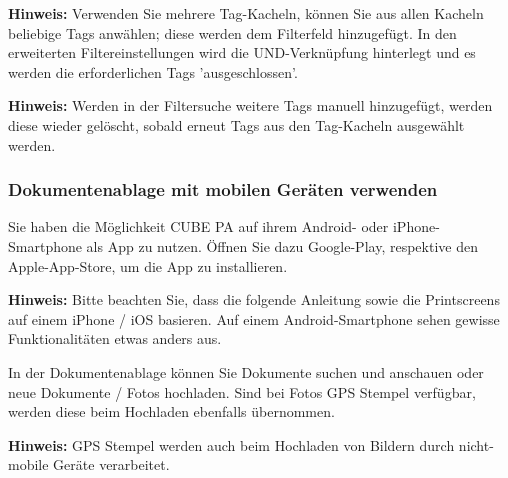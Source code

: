 \textbf{Hinweis:} Verwenden Sie mehrere Tag-Kacheln, können Sie aus allen Kacheln beliebige Tags anwählen; diese werden dem Filterfeld hinzugefügt. In den erweiterten Filtereinstellungen  wird die UND-Verknüpfung  hinterlegt und es werden die erforderlichen Tags 'ausgeschlossen'.

\vspace{\baselineskip}

\textbf{Hinweis:} Werden in der Filtersuche weitere Tags manuell hinzugefügt, werden diese wieder gelöscht, sobald erneut Tags aus den Tag-Kacheln ausgewählt werden.

\subsubsection{Dokumentenablage mit mobilen Geräten verwenden}

Sie haben die Möglichkeit CUBE PA auf ihrem Android- oder iPhone-Smartphone als App zu nutzen. Öffnen Sie dazu Google-Play, respektive den Apple-App-Store, um die App zu installieren.

\vspace{\baselineskip}

\textbf{Hinweis:} Bitte beachten Sie, dass die folgende Anleitung sowie die Printscreens auf einem iPhone / iOS basieren. Auf einem Android-Smartphone sehen gewisse Funktionalitäten etwas anders aus.

\vspace{\baselineskip}

In der Dokumentenablage können Sie Dokumente suchen und anschauen oder neue Dokumente / Fotos hochladen. Sind bei Fotos GPS Stempel verfügbar, werden diese beim Hochladen ebenfalls übernommen. 

\vspace{\baselineskip}

\textbf{Hinweis:} GPS Stempel werden auch beim Hochladen von Bildern durch nicht-mobile Geräte verarbeitet.

\pagebreak

